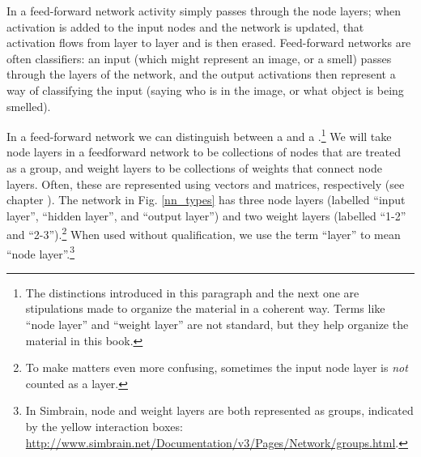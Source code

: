  In a feed-forward network activity simply passes through the node layers; when activation is added to the input nodes and the network is updated, that activation flows from layer to layer and is then erased. Feed-forward networks are often classifiers: an input (which might represent an image, or a smell) passes through the layers of the network, and the output activations then represent a way of classifying the input (saying who is in the image, or what object is being smelled).

In a feed-forward network we can distinguish between a  and a .\footnote{The distinctions introduced in this paragraph and the next one are stipulations made to organize the material in a coherent way. Terms like ``node layer'' and ``weight layer'' are not standard, but they help organize the material in this book.} We will take node layers in a feedforward network to be collections of nodes that are treated as a group, and weight layers to be collections of weights that connect node layers. Often, these are represented using vectors and matrices, respectively (see chapter ). The network in Fig. \ref{nn_types} has three node layers (labelled ``input layer'', ``hidden layer'', and ``output layer'') and two weight layers (labelled ``1-2'' and ``2-3'').\footnote{To make matters even more confusing, sometimes the input node layer is \emph{not} counted as a layer.} When used without qualification, we use the term ``layer'' to mean ``node layer''.\footnote{In Simbrain, node and weight layers are both represented as groups, indicated by the yellow interaction boxes: \url{http://www.simbrain.net/Documentation/v3/Pages/Network/groups.html}.}

